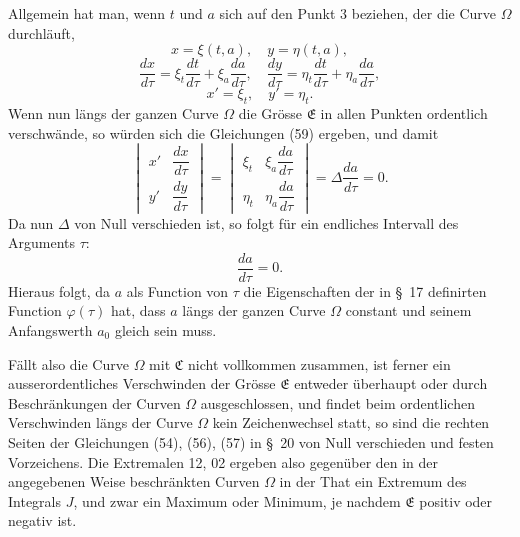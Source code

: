 \documentclass[11pt,a4paper,leqno]{article}
\begin{document}
Allgemein hat man, wenn $t$ und $a$ sich auf den Punkt 3 beziehen, der die Curve $\Omega$ durchläuft,
\[
x=\xi(t,a),\quad y=\eta(t,a),
\]
\[
\frac{dx}{d\tau}=\xi_t\frac{dt}{d\tau}+\xi_a\frac{da}{d\tau},\quad
\frac{dy}{d\tau}=\eta_t\frac{dt}{d\tau}+\eta_a\frac{da}{d\tau},
\]
\[
x'=\xi_t,\quad y'=\eta_t.
\]
Wenn nun längs der ganzen Curve $\Omega$ die Grösse $\mathfrak{E}$ in allen Punkten ordentlich verschwände, so würden sich die Gleichungen (59) ergeben, und damit
\[
\begin{vmatrix}
x' & \dfrac{dx}{d\tau}\\[0.7em]
y' & \dfrac{dy}{d\tau}
\end{vmatrix}
=
\begin{vmatrix}
\xi_t & \xi_a\dfrac{da}{d\tau}\\[0.7em]
\eta_t & \eta_a\dfrac{da}{d\tau}
\end{vmatrix}
=
\Delta\frac{da}{d\tau}=0.
\]
Da nun $\Delta$ von Null verschieden ist, so folgt für ein endliches Intervall des Arguments $\tau$:
\[
\frac{da}{d\tau}=0.
\]
Hieraus folgt, da $a$ als Function von $\tau$ die Eigenschaften der in \S~17 definirten Function $\varphi(\tau)$ hat, dass $a$ längs der ganzen Curve $\Omega$ constant und seinem Anfangswerth $a_0$ gleich sein muss.

Fällt also die Curve $\Omega$ mit $\mathfrak{C}$ nicht vollkommen zusammen, ist ferner ein ausserordentliches Verschwinden der Grösse $\mathfrak{E}$ entweder überhaupt oder durch Beschränkungen der Curven $\Omega$ ausgeschlossen, und findet beim ordentlichen Verschwinden längs der Curve $\Omega$ kein Zeichenwechsel statt, so sind die rechten Seiten der Gleichungen (54), (56), (57) in \S~20 von Null verschieden und
festen Vorzeichens. Die Extremalen 12, 02 ergeben also gegenüber den in der angegebenen Weise beschränkten Curven $\Omega$ in der That ein Extremum des Integrals $J$, und zwar ein Maximum oder Minimum, je nachdem $\mathfrak{E}$ positiv oder negativ ist.
\end{document}
